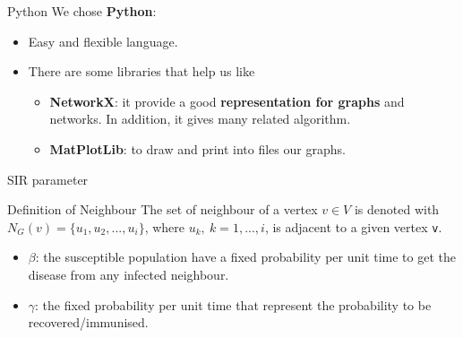 \documentclass{beamer}
\begin{document}
	
	\begin{frame}{Python}
		We chose \textbf{Python}:
		\begin{itemize}
		    \item Easy and flexible language.
		    \item There are some libraries that help us like 
		    \begin{itemize}
		        \item \textbf{NetworkX}: it provide a good \textbf{representation for graphs} and networks. In addition, it gives many related algorithm.
		        \item \textbf{MatPlotLib}: to draw and print into files our graphs.
		    \end{itemize}
		\end{itemize}
	\end{frame}
	
	\begin{frame}{SIR parameter}
	    \begin{alertblock}{Definition of Neighbour}
			The set of neighbour of a vertex $v \in V$ is denoted with $N_G(v) = \{u_1, u_2, ..., u_i \}$, where $u_k,~k=1,...,i$, is adjacent to a given vertex \verb|v|.
		\end{alertblock}
		\pause
	    \begin{itemize}
	        \item \textbf{$\beta$}: the susceptible population have a fixed probability per unit time to get the disease from any infected neighbour.
	        \item \textbf{$\gamma$}: the fixed probability per unit time that represent the probability to be recovered/immunised.
	    \end{itemize}
	\end{frame}
	
\end{document}
